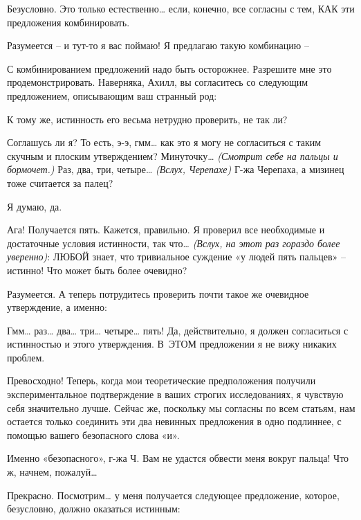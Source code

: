 \documentclass[../main.tex]{subfiles}
\begin{document}
\begin{Dialogue}
 Безусловно. Это только естественно\ldots{} если, конечно, все согласны с тем, КАК эти предложения комбинировать.

 Разумеется \--- и тут-то я вас поймаю! Я предлагаю такую комбинацию \---

 С комбинированием предложений надо быть осторожнее. Разрешите мне это продемонстрировать. Наверняка, Ахилл, вы согласитесь со следующим предложением, описывающим ваш странный род:


К тому же, истинность его весьма нетрудно проверить, не так ли?

 Соглашусь ли я? То есть, э-э, гмм\ldots{} как это я могу не согласиться с таким скучным и плоским утверждением? Минуточку\ldots{} \emph{(Смотрит себе на пальцы и бормочет.)} Раз, два, три, четыре\ldots{} \emph{(Вслух, Черепахе)} Г-жа Черепаха, а мизинец тоже считается за палец?

 Я думаю, да.

 Ага! Получается пять. Кажется, правильно. Я проверил все необходимые и достаточные условия истинности, так что\ldots{} \emph{(Вслух, на этот раз гораздо более уверенно)}: ЛЮБОЙ знает, что тривиальное суждение «у людей пять пальцев» \--- истинно! Что может быть более очевидно?

 Разумеется. А теперь потрудитесь проверить почти такое же очевидное утверждение, а именно:


 Гмм\ldots{} раз\ldots{} два\ldots{} три\ldots{} четыре\ldots{} пять! Да, действительно, я должен согласиться с истинностью и этого утверждения. В~ЭТОМ предложении я не вижу никаких проблем.

 Превосходно! Теперь, когда мои теоретические предположения получили экспериментальное подтверждение в ваших строгих исследованиях, я чувствую себя значительно лучше. Сейчас же, поскольку мы согласны по всем статьям, нам остается только соединить эти два невинных предложения в одно подлиннее, с помощью вашего безопасного слова «и».

 Именно «безопасного», г-жа Ч\@. Вам не удастся обвести меня вокруг пальца! Что ж, начнем, пожалуй\ldots{}

 Прекрасно. Посмотрим\ldots{} у меня получается следующее предложение, которое, безусловно, должно оказаться истинным:


\end{Dialogue}
\end{document}
